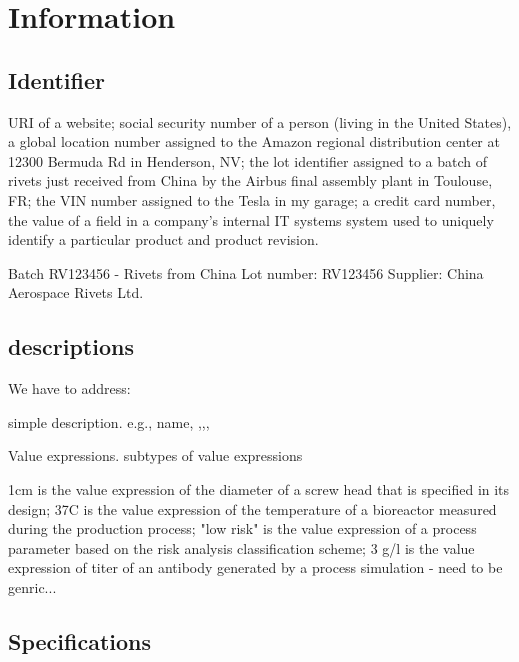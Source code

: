 \chapter{Information}

\section{Identifier}

URI of a website; social security number of a person (living in the United States), a global location number assigned to the Amazon regional distribution center at 12300 Bermuda Rd in Henderson, NV; the lot identifier assigned to a batch of rivets just received from China by the Airbus final assembly plant in Toulouse, FR; the VIN number assigned to the Tesla in my garage; a credit card number, the value of a field in a company's internal IT systems system used to uniquely identify a particular product and product revision.

Batch RV123456 - Rivets from China Lot number: RV123456
Supplier: China Aerospace Rivets Ltd. 

\section{descriptions}

We have to address:

simple description. e.g., name, ,,,

Value expressions. subtypes of value expressions

1cm is the value expression of the diameter of a screw head that is specified in its design; 37C is the value expression of the temperature of a bioreactor measured during the production process; "low risk" is the value expression of a process parameter based on the risk analysis classification scheme; 3 g/l is the value expression of titer of an antibody generated by a process simulation - need to be genric...


\section{Specifications}